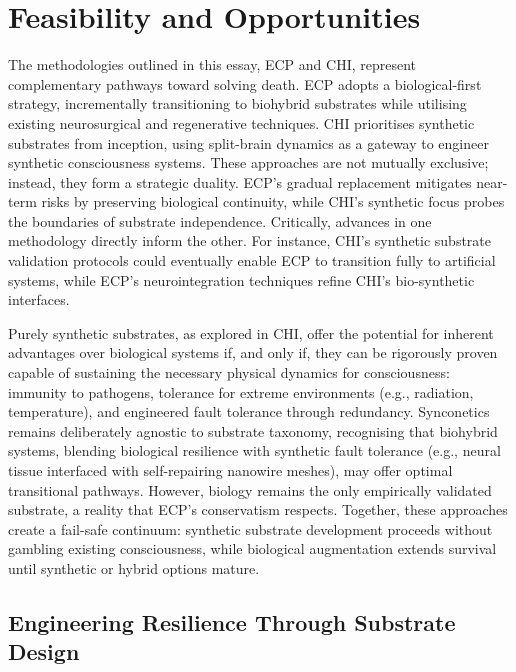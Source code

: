 \documentclass[10pt]{article}
\begin{document}
\begin{sloppypar}

  \section{Feasibility and Opportunities}
  \label{sec:feasibility}

  The methodologies outlined in this essay, ECP and CHI, represent complementary pathways toward solving death. ECP adopts a biological-first strategy, incrementally transitioning to biohybrid substrates while utilising existing neurosurgical and regenerative techniques. CHI prioritises synthetic substrates from inception, using split-brain dynamics as a gateway to engineer synthetic consciousness systems. These approaches are not mutually exclusive; instead, they form a strategic duality. ECP’s gradual replacement mitigates near-term risks by preserving biological continuity, while CHI’s synthetic focus probes the boundaries of substrate independence. Critically, advances in one methodology directly inform the other. For instance, CHI’s synthetic substrate validation protocols could eventually enable ECP to transition fully to artificial systems, while ECP’s neurointegration techniques refine CHI’s bio-synthetic interfaces.

  Purely synthetic substrates, as explored in CHI, offer the potential for inherent advantages over biological systems if, and only if, they can be rigorously proven capable of sustaining the necessary physical dynamics for consciousness: immunity to pathogens, tolerance for extreme environments (e.g., radiation, temperature), and engineered fault tolerance through redundancy. Synconetics remains deliberately agnostic to substrate taxonomy, recognising that biohybrid systems, blending biological resilience with synthetic fault tolerance (e.g., neural tissue interfaced with self-repairing nanowire meshes), may offer optimal transitional pathways. However, biology remains the only empirically validated substrate, a reality that ECP’s conservatism respects. Together, these approaches create a fail-safe continuum: synthetic substrate development proceeds without gambling existing consciousness, while biological augmentation extends survival until synthetic or hybrid options mature.

  \subsection{Engineering Resilience Through Substrate Design}
  \label{sec:engineering-resilience}


\end{sloppypar}
\end{document}
